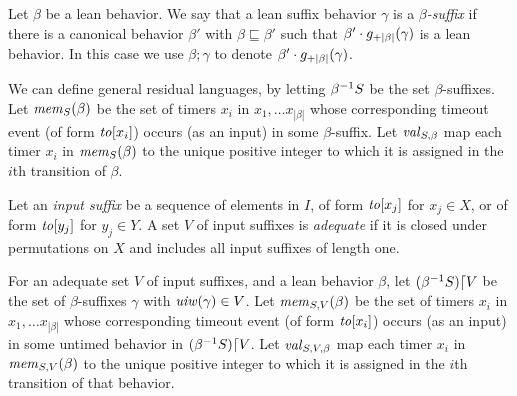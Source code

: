 Let $\beta$ be a lean behavior. We say that 
a lean suffix behavior $\gamma$ is a {\em $\beta$-suffix} if
there is a canonical behavior $\beta'$ with $\beta \sqsubseteq \beta'$ such that
$\beta'\cdot g_{+{|\beta|}}(\gamma)$ is a lean behavior. In this case we
use $\beta;\gamma$ to denote $\beta'\cdot g_{+{|\beta|}}(\gamma)$.

We can define general residual languages, by letting
${\beta}^{-1}{S}$ be the set $\beta$-suffixes.
Let $\mathit{mem}_{S}(\beta)$ be the set of timers $x_i$ in
$x_1 , \ldots x_{|\beta|}$ whose corresponding timeout event
(of form $\mathit{to}[x_i]$) occurs (as an input) in some $\beta$-suffix.
Let $\mathit{val}_{S,\beta}$ map each timer $x_i$ in
$\mathit{mem}_{S}(\beta)$ to the unique positive integer to which it
is assigned in the $i$th transition of $\beta$.

Let an {\em input suffix} be a sequence of elements
in $I$, of form $\mathit{to}[x_j]$ for $x_j \in X$, or
of form $\mathit{to}[y_j]$ for $y_j \in Y$.
A set $V$ of input suffixes is {\em adequate} if it is closed under permutations
on $X$ and includes all input suffixes of length one.

For an adequate set $V$ of input suffixes, and a lean behavior $\beta$,
let $({\beta}^{-1}{S})\lceil{V}$ be the set of $\beta$-suffixes $\gamma$
with $\mathit{uiw}(\gamma) \in V$.
Let $\mathit{mem}_{S,V}(\beta)$ be the set of timers $x_i$ in
$x_1 , \ldots x_{|\beta|}$ whose corresponding timeout event
(of form $\mathit{to}[x_i]$) occurs (as an input) in some untimed behavior in
$({\beta}^{-1}{S})\lceil{V}$.
Let $\mathit{val}_{S,V,\beta}$ map each timer $x_i$ in
$\mathit{mem}_{S,V}(\beta)$ to the unique positive integer to which it
is assigned in the $i$th transition of that behavior.



